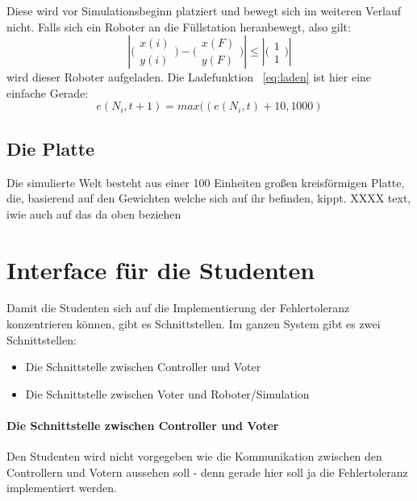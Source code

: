 Diese wird vor Simulationsbeginn platziert und bewegt sich im weiteren Verlauf nicht.
Falls sich ein Roboter an die F{\"{u}}llstation heranbewegt, also gilt: 
\begin{equation}
    \label{eq:dist}
 |\bigl(\begin{smallmatrix} x(i) \\ y(i) \end{smallmatrix}\bigr) - \bigl(\begin{smallmatrix} x(F) \\ y(F) \end{smallmatrix}\bigr)| \leq |\bigl(\begin{smallmatrix} 1 \\ 1 \end{smallmatrix}\bigr)|
\end{equation}
wird dieser Roboter aufgeladen. Die Ladefunktion ~\ref{eq:laden} ist hier eine einfache Gerade:
\begin{equation}
    \label{eq:laden}
	e(N_i, t + 1) = max((e(N_i, t) + 10, 1000) 
\end{equation}

\subsection{Die Platte}\label{plate}
Die simulierte Welt besteht aus einer 100 Einheiten gro{\ss}en kreisf{\"{o}}rmigen Platte, die, basierend auf den Gewichten welche sich auf ihr befinden, kippt.
XXXX \todo{} text, iwie auch auf das da oben beziehen



\clearpage
\section{Interface f{\"{u}}r die Studenten}\label{interface}
Damit die Studenten sich auf die Implementierung der Fehlertoleranz konzentrieren k{\"{o}}nnen, gibt es Schnittstellen.
Im ganzen System gibt es zwei Schnittstellen:
\begin{itemize}
\item Die Schnittstelle zwischen Controller und Voter
\item Die Schnittstelle zwischen Voter und Roboter/Simulation
\end{itemize}

\paragraph{Die Schnittstelle zwischen Controller und Voter} Den Studenten wird nicht vorgegeben wie die Kommunikation zwischen den Controllern und Votern aussehen soll - denn gerade hier soll ja die Fehlertoleranz implementiert werden.

